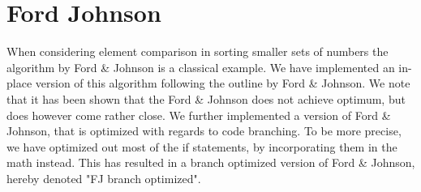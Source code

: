 \section{Ford Johnson}
When considering element comparison in sorting smaller sets of numbers the algorithm by Ford \& Johnson is a classical example\cite{fj59}. We have implemented an in-place version of this algorithm following the outline by Ford \& Johnson\cite{fj59}. We note that it has been shown that the Ford \& Johnson does not achieve optimum, but does however come rather close\cite{m79}. We further implemented a version of Ford \& Johnson, that is optimized with regards to code branching. To be more precise, we have optimized out most of the if statements, by incorporating them in the math instead. This has resulted in a branch optimized version of Ford \& Johnson, hereby denoted "FJ branch optimized".